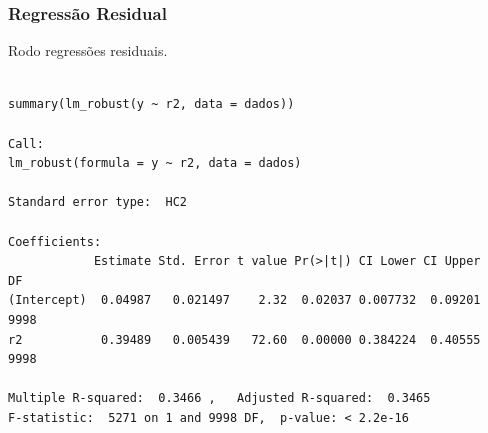 \documentclass[10pt,slides,xcolor=pdftex,dvipsnames,table]{beamer}
\begin{document}
\begin{frame}[fragile]
	\frametitle{Regressão Residual}

\vspace{0.5cm}
Rodo regressões residuais.

\begin{lstlisting}

summary(lm_robust(y ~ r2, data = dados))

Call:
lm_robust(formula = y ~ r2, data = dados)

Standard error type:  HC2 

Coefficients:
            Estimate Std. Error t value Pr(>|t|) CI Lower CI Upper   DF
(Intercept)  0.04987   0.021497    2.32  0.02037 0.007732  0.09201 9998
r2           0.39489   0.005439   72.60  0.00000 0.384224  0.40555 9998

Multiple R-squared:  0.3466 ,	Adjusted R-squared:  0.3465 
F-statistic:  5271 on 1 and 9998 DF,  p-value: < 2.2e-16

\end{lstlisting}

\end{frame}

\end{document}
